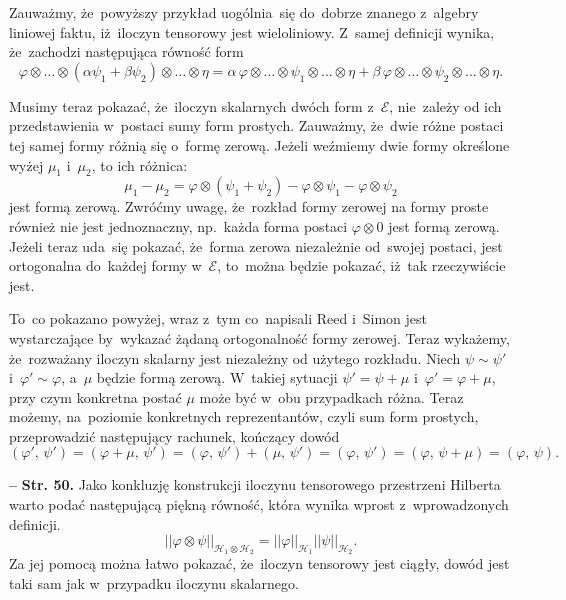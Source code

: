 \documentclass[a4paper,11pt]{article}
\newcommand{\ld}{\ldots}
\newcommand{\mc}{\mathcal}
\newcommand{\al}{\alpha}
\newcommand{\vp}{\varphi}
\newcommand{\Hc}{\mc{H}}
\newcommand{\ot}{\otimes}
\newcommand{\norm}[1]{\left|\left| #1 \right|\right|}
\newcommand{\tb}{\textbf}
\newcommand{\noi}{\noindent}
\newcommand{\start}{\noi \tb{--} {}}
\newcommand{\Str}[1]{\tb{Str. #1.}}
\newcommand{\SP}[2]{( #1, \, #2 )} %
\begin{document}
Zauważmy, że~powyższy przykład uogólnia~się do~dobrze znanego
z~algebry liniowej faktu, iż~iloczyn tensorowy jest wieloliniowy.
Z~samej definicji wynika, że~zachodzi następująca równość form
\begin{equation*}
  \vp \ot \ld \ot ( \al \psi_{ 1 } + \beta \psi_{ 2 } ) \ot \ld \ot \eta
  = \al \, \vp \ot \ld \ot \psi_{ 1 } \ot \ld \ot \eta
  + \beta \, \vp \ot \ld \ot \psi_{ 2 } \ot \ld \ot \eta.
\end{equation*}

Musimy teraz pokazać, że~iloczyn skalarnych dwóch form z~$\mc{E}$,
nie~zależy od ich przedstawienia w~postaci sumy form prostych.
Zauważmy, że~dwie różne postaci tej samej formy różnią się o~formę
zerową. Jeżeli weźmiemy dwie formy określone wyżej $\mu_{ 1 }$
i~$\mu_{ 2 }$, to ich różnica:
\begin{equation*}
  \mu_{ 1 } - \mu_{ 2 } = \vp \ot ( \psi_{ 1 } + \psi_{ 2 } )
  - \vp \ot \psi_{ 1 } - \vp \ot \psi_{ 2 }
\end{equation*}
jest formą zerową. Zwróćmy uwagę, że~rozkład formy zerowej na formy
proste również nie jest jednoznaczny, np.~każda forma postaci
$\vp \ot 0$ jest formą zerową. Jeżeli teraz uda~się pokazać, że~forma
zerowa niezależnie od~swojej postaci, jest ortogonalna do~każdej formy
w~$\mc{E}$, to~można będzie pokazać, iż~tak rzeczywiście jest.

To~co pokazano powyżej, wraz z~tym co~napisali Reed i~Simon jest
wystarczające by~wykazać żądaną ortogonalność formy zerowej. Teraz
wykażemy, że~rozważany iloczyn skalarny jest niezależny od użytego
rozkładu. Niech $\psi \sim \psi'$ i~$\vp' \sim \vp$, a~$\mu$ będzie
formą zerową. W~takiej sytuacji $\psi' = \psi + \mu$
i~$\vp' = \vp + \mu$, przy czym konkretna postać $\mu$ może być w~obu
przypadkach różna. Teraz możemy, na~poziomie konkretnych
reprezentantów, czyli sum form prostych, przeprowadzić następujący
rachunek, kończący dowód
\begin{equation*}
  \SP{ \vp' }{ \psi' } = \SP{ \vp + \mu }{ \psi' }
  = \SP{ \vp }{ \psi' } + \SP{ \mu }{ \psi' } = \SP{ \vp }{ \psi' }
  = \SP{ \vp }{ \psi + \mu } = \SP{ \vp }{ \psi }.
\end{equation*}


\start \Str{50} Jako konkluzję konstrukcji iloczynu tensorowego
przestrzeni Hilberta warto podać następującą piękną równość, która
wynika wprost z~wprowadzonych definicji.
\begin{equation*}
  \norm{ \vp \ot \psi }_{ \Hc_{ 1 } \ot \Hc_{ 2 } }
  = \norm{ \vp }_{ \Hc_{ 1 } } \norm{ \psi }_{ \Hc_{ 2 } }.
\end{equation*}
Za jej pomocą można łatwo pokazać, że~iloczyn tensorowy jest ciągły,
dowód jest taki sam jak w~przypadku iloczynu skalarnego.
\end{document}
